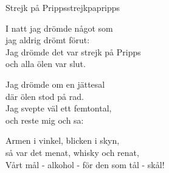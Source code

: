 \begin{song}{Strejk på Pripps}{strejkpapripps}
\begin{vers}
I natt jag drömde något som\\
jag aldrig drömt förut:\\
Jag drömde det var strejk på Pripps\\
och alla ölen var slut.\\
\end{vers}
\begin{vers}
Jag drömde om en jättesal\\
där ölen stod på rad.\\
Jag svepte väl ett femtontal,\\
och reste mig och sa:\\
\end{vers}
\begin{vers}
Armen i vinkel, blicken i skyn,\\
så var det menat, whisky och renat,\\
Vårt mål - alkohol - för den som tål - skål!\\
\end{vers}
\end{song}
